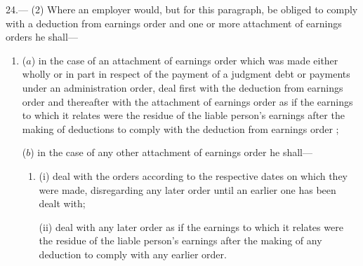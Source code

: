 \documentclass[12pt,a4paper]{article}
\begin{document}
24.—%
%
%
(2) Where an employer would, but for this paragraph, be obliged to comply with 
a deduction from earnings order  %
and one or more attachment of earnings orders he shall—
\begin{enumerate}\item[]
($a$) in the case of an attachment of earnings order which was made either wholly or in part in respect of the payment of a judgment debt or payments under an administration order, deal first with the deduction from earnings order
and thereafter with the attachment of earnings order as if the earnings to which it relates were the residue of the liable person’s earnings after the making of deductions to comply with the deduction from earnings order%
;

($b$) in the case of any other attachment of earnings order
he shall—
\begin{enumerate}\item[]
(i) deal with the orders according to the respective dates on which they were made, disregarding any later order until an earlier one has been dealt with;

(ii) deal with any later order as if the earnings to which it relates were the residue of the liable person’s earnings after the making of any deduction to comply with any earlier order.
\end{enumerate}  %
\end{enumerate}
\end{document}
